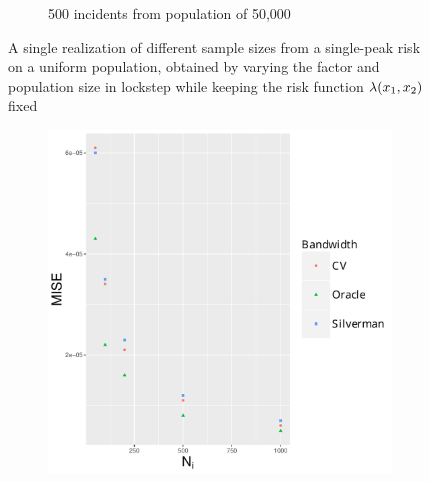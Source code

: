 \begin{figure}[htbp]
\begin{subfigure}{0.45\textwidth}
        \caption{500 incidents from population of 50,000}
    \end{subfigure}
    \caption[Examples showing sample size]
        {A single realization of different sample sizes from a single-peak risk on a uniform population, obtained by varying the \gls{factor} and population size in lockstep while keeping the risk function $\lambda (x_1, x_2)$ fixed}
    \label{fig:one_sample:unifNpop_1h}
\end{figure}

\begin{figure}[htbp]
    \centering
    \begin{subfigure}[b]{0.24\textwidth}
        \includegraphics[width=\textwidth]{results/by_pop_size/MISE-vs-population}
        \caption{}
        \label{fig:ise:unifNpop_1h:mise}
    \end{subfigure}
    \begin{subfigure}[b]{0.24\textwidth}

\end{subfigure}
\end{figure}
